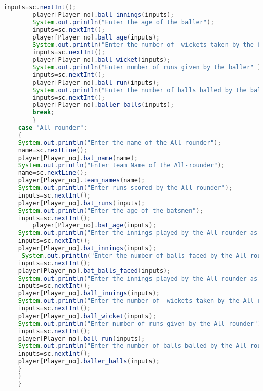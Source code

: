 \documentclass{article}
\begin{document}
\begin{lstlisting}[style=chstyle,language=Java]
        inputs=sc.nextInt();
        player[Player_no].ball_innings(inputs);
        System.out.println("Enter the age of the baller");
        inputs=sc.nextInt();
        player[Player_no].ball_age(inputs);
        System.out.println("Enter the number of  wickets taken by the baller");
        inputs=sc.nextInt();
        player[Player_no].ball_wicket(inputs);
        System.out.println("Enter number of runs given by the baller" );
        inputs=sc.nextInt();
        player[Player_no].ball_run(inputs);
        System.out.println("Enter the number of balls balled by the baller");
        inputs=sc.nextInt();
        player[Player_no].baller_balls(inputs);
        break;
        }
    case "All-rounder":
    {
    System.out.println("Enter the name of the All-rounder");
    name=sc.nextLine();
    player[Player_no].bat_name(name); 
    System.out.println("Enter team Name of the All-rounder");
    name=sc.nextLine();
    player[Player_no].team_names(name);
    System.out.println("Enter runs scored by the All-rounder");
    inputs=sc.nextInt();
    player[Player_no].bat_runs(inputs);
    System.out.println("Enter the age of the batsmen");
    inputs=sc.nextInt();
        player[Player_no].bat_age(inputs);
    System.out.println("Enter the innings played by the All-rounder as batsmen");
    inputs=sc.nextInt();
    player[Player_no].bat_innings(inputs);
     System.out.println("Enter the number of balls faced by the All-rounder");
    inputs=sc.nextInt();
    player[Player_no].bat_balls_faced(inputs);
    System.out.println("Enter the innings played by the All-rounder as baller");
    inputs=sc.nextInt();
    player[Player_no].ball_innings(inputs);
    System.out.println("Enter the number of  wickets taken by the All-rounder");
    inputs=sc.nextInt();
    player[Player_no].ball_wicket(inputs);
    System.out.println("Enter number of runs given by the All-rounder");
    inputs=sc.nextInt();
    player[Player_no].ball_run(inputs);
    System.out.println("Enter the number of balls balled by the All-rounder");
    inputs=sc.nextInt();
    player[Player_no].baller_balls(inputs);
    }
    }
    }
        

\end{lstlisting}
\end{document}
